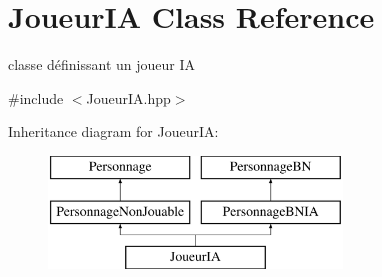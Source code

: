 \hypertarget{classJoueurIA}{\section{Joueur\-I\-A Class Reference}
\label{classJoueurIA}
}


classe définissant un joueur I\-A  




{\ttfamily \#include $<$Joueur\-I\-A.\-hpp$>$}

Inheritance diagram for Joueur\-I\-A\-:\begin{figure}[H]
\begin{center}
\leavevmode
\includegraphics[height=3.000000cm]{classJoueurIA}
\end{center}
\end{figure}
